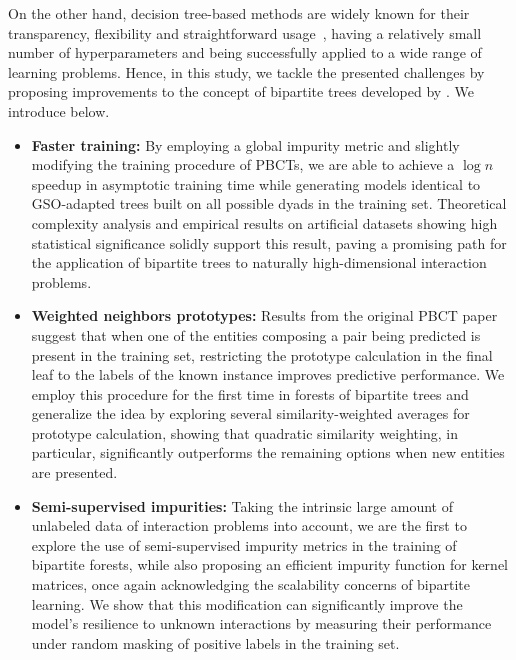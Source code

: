 On the other hand, decision tree-based methods are widely known for their transparency, flexibility and straightforward usage~\cite{}, having a relatively small number of hyperparameters and being successfully applied to a wide range of learning problems. Hence, in this study, we tackle the presented challenges by proposing improvements to the concept of bipartite trees developed by \cite{pliakos2018}. We introduce below.
%
\begin{itemize}
    \item \textbf{Faster training:} By employing a global impurity metric and slightly modifying the training procedure of PBCTs, we are able to achieve a $\log n$ speedup in asymptotic training time while generating models identical to GSO-adapted trees built on all possible dyads in the training set. Theoretical complexity analysis and empirical results on artificial datasets showing high statistical significance solidly support this result, paving a promising path for the application of bipartite trees to naturally high-dimensional interaction problems.
    \item \textbf{Weighted neighbors prototypes:} Results from the original PBCT paper~\cite{pliakos2018predictive} suggest that when one of the entities composing a pair being predicted is present in the training set, restricting the prototype calculation in the final leaf to the labels of the known instance improves predictive performance. We employ this procedure for the first time in forests of bipartite trees and generalize the idea by exploring several similarity-weighted averages for prototype calculation, showing that quadratic similarity weighting, in particular, significantly outperforms the remaining options when new entities are presented.
    \item \textbf{Semi-supervised impurities:} Taking the intrinsic large amount of unlabeled data of interaction problems into account, we are the first to explore the use of semi-supervised impurity metrics in the training of bipartite forests, while also proposing an efficient impurity function for kernel matrices, once again acknowledging the scalability concerns of bipartite learning. We show that this modification can significantly improve the model's resilience to unknown interactions by measuring their performance under random masking of positive labels in the training set.
\end{itemize}

